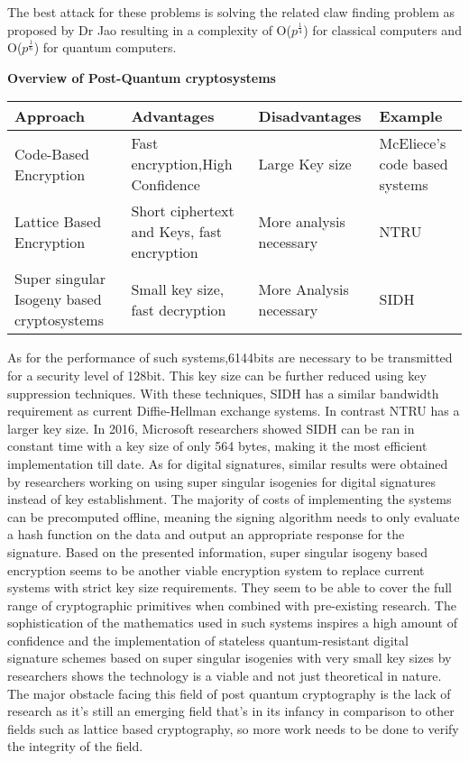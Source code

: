 \documentclass[10pt,a4paper]{IEEEtran}
\begin{document}
The best attack for these problems is solving the related claw finding problem as proposed by Dr Jao\cite{supersing}
resulting in a complexity of O(\(p^\frac{1}{4}\)) for classical computers and O(\(p^\frac{1}{6}\)) for quantum computers. 
\newline
\newline
\begin{table*}[t!]
\begin{center}
	\textbf{Overview of Post-Quantum cryptosystems}
	\begin{tabular}{ | m{5cm} | m{5cm} | m{3cm} | m{3cm} | }
		\hline
		Approach & Advantages & Disadvantages & Example \\
		\hline
		Code-Based Encryption & Fast encryption,High Confidence & Large Key size & McEliece's code based systems\\
		\hline
		Lattice Based Encryption & Short ciphertext and Keys, fast encryption & More analysis necessary & NTRU \\
		\hline
		Super singular Isogeny based cryptosystems &Small key size, fast decryption &More Analysis necessary & SIDH \\
		\hline
	\end{tabular}
\end{center}
\end{table*}
As for the performance of such systems,6144bits are necessary to be transmitted for a security level of 128bit. This key size can be further reduced using key suppression techniques. With these techniques, SIDH has a similar bandwidth requirement as current Diffie-Hellman exchange systems. In contrast NTRU has a larger key size.
In 2016, Microsoft researchers showed SIDH can be ran in constant time with a key size of only 564 bytes, making it the most efficient implementation till date.
\newline
As for digital signatures, similar results were obtained by researchers working on using super singular isogenies for digital signatures instead of key establishment. The majority of costs of implementing the systems can be precomputed offline, meaning the signing algorithm needs to only evaluate a hash function on the data and output an appropriate response for the signature.
\newline
\newline
Based on the presented information, super singular isogeny based encryption seems to be another viable encryption system to replace current systems with strict key size requirements. They seem to be able to cover the full range of cryptographic primitives when combined with pre-existing research. The sophistication of the mathematics used in such systems inspires a high amount of confidence and the implementation of stateless quantum-resistant digital signature schemes based on super singular isogenies with very small key sizes by researchers shows the technology is a viable and not just theoretical in nature. The major obstacle facing this field of post quantum cryptography is the lack of research as it's still an emerging field that's in its infancy in comparison to other fields such as lattice based cryptography, so more work needs to be done to verify the integrity of the field.
\end{document}
